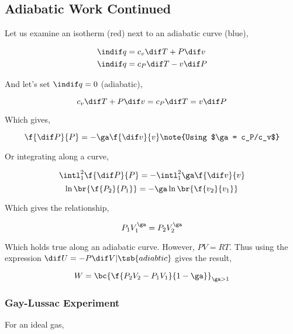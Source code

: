 \documentclass{article}
\begin{document}
\subsection{Adiabatic Work Continued}

Let us examine an isotherm (red) next to an adiabatic curve (blue),

\begin{center}
\end{center}

\begin{align*}
    \indif q &= c_v \dif T + P \dif v \\
    \indif q &= c_P \dif T - v \dif P
\end{align*}

And let's set $\indif q = 0$ (adiabatic),

\[ c_v \dif T + P \dif v = c_P \dif T = v \dif P \]

Which gives,

\[ \f{\dif P}{P} = - \ga \f{\dif v}{v} \note{Using $\ga = c_P/c_v$} \]

Or integrating along a curve,

\[ \intl_1^2 \f{\dif P}{P} = - \intl_1^2 \ga \f{\dif v}{v} \]
\[ \ln\br{\f{P_2}{P_1}} = - \ga \ln\br{\f{v_2}{v_1}} \]

Which gives the relationship,

\[ P_1V_1^\ga = P_2V_2^\ga \]

Which holds true along an adiabatic curve. However, $PV = RT$. Thus using the expression $\dif U = - P \dif V |\tsb{adiabtic}$ gives the result,

\[ W = \bc{\f{P_2V_2 - P_1V_1}{1-\ga}}_{\ga > 1} \]

\subsubsection{Gay-Lussac Experiment}
\label{sec:guylussac}

For an ideal gas,
\end{document}
